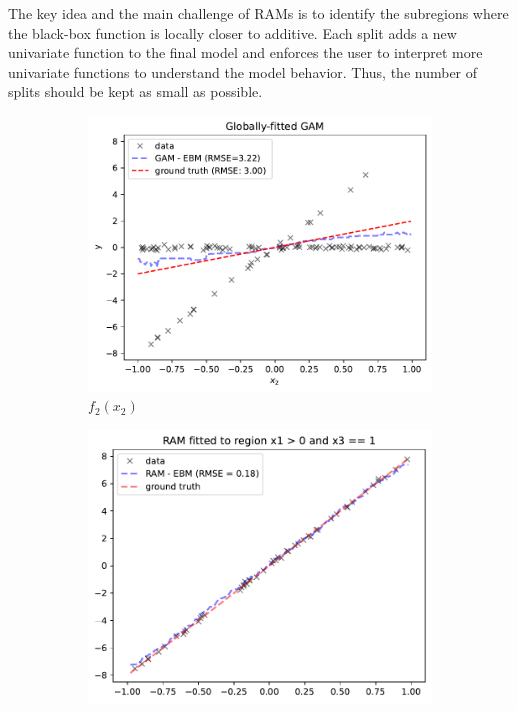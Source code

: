 \documentclass[12pt]{article}
\begin{document}
The key idea and the main challenge of RAMs is to identify the subregions where the black-box function is locally
closer to additive.
Each split adds a new univariate function to the final model and enforces the user to interpret more univariate functions to understand the model behavior.
Thus, the number of splits should be kept as small as possible.


\begin{figure}[htbp]
    \centering
    \begin{subfigure}{0.32\textwidth}
        \centering
        \includegraphics[width=\textwidth]{figures/global_GAM.pdf}
        \caption{$f_2(x_2)$}
        \label{subfig:global_gam}
    \end{subfigure}
    \begin{subfigure}{0.32\textwidth}
        \centering
        \includegraphics[width=\textwidth]{figures/regional_gam_subreg_1.pdf}

\end{subfigure}
\end{figure}
\end{document}

